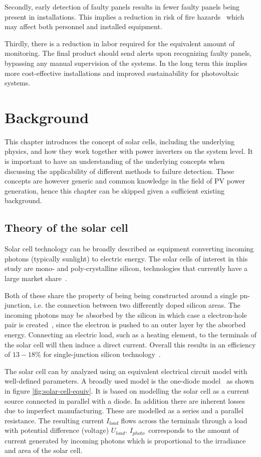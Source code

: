 Secondly, early detection of faulty panels results in fewer faulty panels being present in installations.
This implies a reduction in risk of fire hazards~\cite{Zhao2010night} which may affect both personnel and installed equipment.

Thirdly, there is a reduction in labor required for the equivalent amount of monitoring.
The final product should send alerts upon recognizing faulty panels, bypassing any manual supervision of the systems.
In the long term this implies more cost-effective installations and improved sustainability for photovoltaic systems.

\chapter{Background}
This chapter introduces the concept of solar cells, including the underlying physics,
and how they work together with power inverters on the system level.
It is important to have an understanding of the underlying concepts when discussing the applicability of different methods to failure detection.
These concepts are however generic and common knowledge in the field of PV power generation, 
hence this chapter can be skipped given a sufficient existing background.

\section{Theory of the solar cell}
Solar cell technology can be broadly described as equipment converting incoming photons (typically sunlight) to electric energy.
The solar cells of interest in this study are mono- and poly-crystalline silicon, technologies that currently have a large market share~\cite{Zhao2010thesis}.

Both of these share the property of being being constructed around a single pn-junction, i.e. the connection between two differently doped silicon areas.
The incoming photons may be absorbed by the silicon in which case a electron-hole pair is created~\cite{Zhao2010thesis}, since the electron is pushed to an outer layer by the absorbed energy.
Connecting an electric load, such as a heating element, to the terminals of the solar cell will then induce a direct current.
Overall this results in an efficiency of $13-18\%$ for single-junction silicon technology~\cite{Zhao2010thesis}.

The solar cell can by analyzed using an equivalent electrical circuit model with well-defined parameters.
A broadly used model is the one-diode model~\cite{Walker2001} as shown in figure \ref{fig:solar-cell-equiv}.
It is based on modelling the solar cell as a current source connected in parallel with a diode.
In addition there are inherent losses due to imperfect manufacturing.
These are modelled as a series and a parallel resistance.
The resulting current $I_{load}$ flows across the terminals through a load with potential difference (voltage) $U_{load}$.
$I_{photo}$ corresponds to the amount of current generated by incoming photons which is proportional to the irradiance and area of the solar cell.

